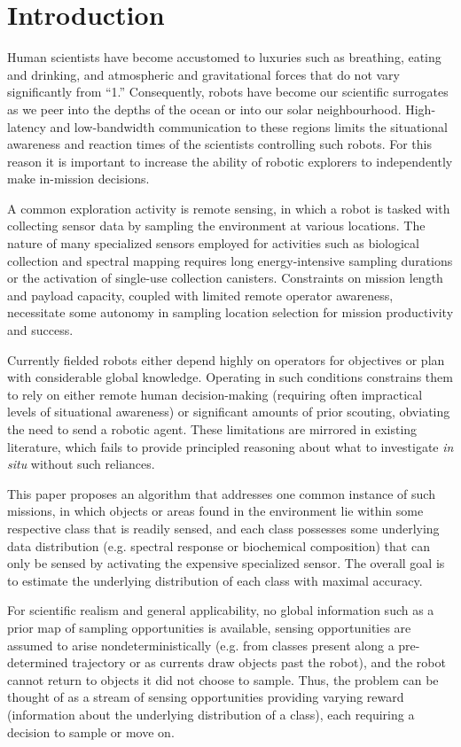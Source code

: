 \section{Introduction}
\label{sec:intro}

Human scientists have become accustomed to luxuries such as breathing, eating
and drinking, and atmospheric and gravitational forces that do not
vary significantly from ``1.''  Consequently, robots have become our scientific
surrogates as we peer into the depths of the ocean or into our solar
neighbourhood.  High-latency and low-bandwidth communication to these regions limits the situational awareness and reaction times of the scientists controlling such robots.  For this reason it is important to increase the ability of robotic explorers to independently make in-mission decisions.

A common exploration activity is remote sensing, in which a robot is tasked with collecting sensor data by sampling the environment at various locations.  The nature of many specialized sensors employed for activities such as biological collection and spectral mapping requires long energy-intensive sampling durations or the activation of single-use collection canisters.  Constraints on mission length and payload capacity, coupled with limited remote operator awareness, necessitate some autonomy in sampling location selection for mission productivity and success.

Currently fielded robots either depend highly on operators for objectives or plan with considerable global knowledge.  Operating in such conditions constrains them to rely on either remote human decision-making (requiring often impractical levels of situational awareness) or significant amounts of prior scouting, obviating the need to send a robotic agent.  These limitations are mirrored in existing literature, which fails to provide principled reasoning about what to investigate \emph{in situ} without such reliances.

This paper proposes an algorithm that addresses one common instance of such missions, in which objects or areas found in the environment lie within some respective class that is readily sensed, and each class possesses some underlying data distribution (e.g. spectral response or biochemical composition) that can only be sensed by activating the expensive specialized sensor.  The overall goal is to estimate the underlying distribution of each class with maximal accuracy.

For scientific realism and general applicability, no global information such as a prior map of sampling opportunities is available, sensing opportunities are assumed to arise nondeterministically (e.g. from classes present along a pre-determined trajectory or as currents draw objects past the robot), and the robot cannot return to objects it did not choose to sample.  Thus, the problem can be thought of as a stream of sensing opportunities providing varying reward (information about the underlying distribution of a class), each requiring a decision to sample or move on.

